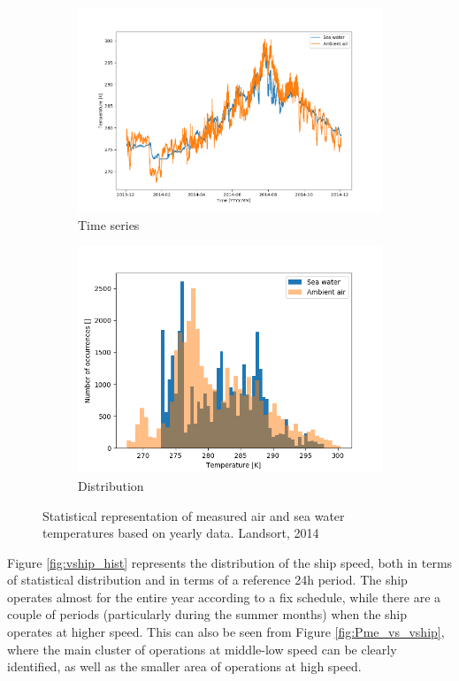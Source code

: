 \documentclass[preprint,12pt]{elsarticle}
\begin{document}
\begin{figure}[htbp]
	\centering
	\begin{subfigure}[b]{0.45\textwidth}
		\centering
		\includegraphics[width=0.999\linewidth]{Figures/Tsea_vs_time}
		\caption{Time series}
		\label{fig:TseaTairTIME}
	\end{subfigure}
	\begin{subfigure}[b]{0.45\textwidth}
		\centering
		\includegraphics[width=0.9\linewidth]{Figures/Tsea_hist}
		\caption{Distribution}
		\label{fig:TseaTairDIST}
	\end{subfigure}
	\caption{Statistical representation of measured air and sea water temperatures based on yearly data. Landsort, 2014}
	\label{fig:TseaTair}
\end{figure}


Figure \ref{fig:vship_hist} represents the distribution of the ship speed, both in terms of statistical distribution and in terms of a reference 24h period. The ship operates almost for the entire year according to a fix schedule, while there are a couple of periods (particularly during the summer months) when the ship operates at higher speed. This can also be seen from Figure \ref{fig:Pme_vs_vship}, where the main cluster of operations at middle-low speed can be clearly identified, as well as the smaller area of operations at high speed. 
\end{document}

